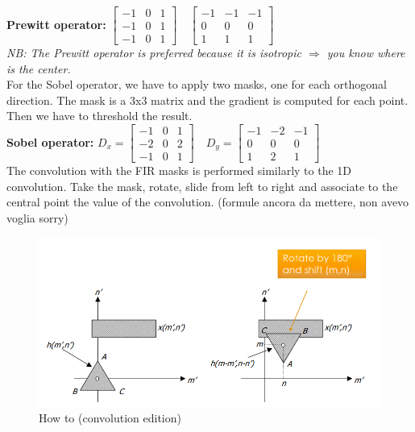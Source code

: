 \vspace{0.5cm} 
\textbf{Prewitt operator:} $\begin{bmatrix} -1 & 0 & 1 \\ -1 & 0 & 1 \\ -1 & 0 & 1 \end{bmatrix} \quad \begin{bmatrix} -1 & -1 & -1 \\ 0 & 0 & 0 \\ 1 & 1 & 1 \end{bmatrix}$
\\
\textit{NB: The Prewitt operator is preferred because it is isotropic $\Rightarrow$ you know where is the center.}
\\
For the Sobel operator, we have to apply two masks, one for each orthogonal direction. The mask is a 3x3 matrix and the gradient is computed for each point. Then we have to threshold the result.
\\\vspace{1cm} 
\textbf{Sobel operator:} $D_x=\begin{bmatrix} -1 & 0 & 1 \\ -2 & 0 & 2 \\ -1 & 0 & 1 \end{bmatrix} \quad D_y=\begin{bmatrix} -1 & -2 & -1 \\ 0 & 0 & 0 \\ 1 & 2 & 1 \end{bmatrix}$
\\
The convolution with the FIR masks is performed similarly to the 1D convolution. Take the mask, rotate, slide from left to right and associate to the central point the value of the convolution. (formule ancora da mettere, non avevo voglia sorry)
\begin{figure}[h]
    \centering
    \includegraphics[scale=0.3]{Figures/Convolution.png}
    \caption{How to (convolution edition)}
    \label{fig:enter-label}
\end{figure}

